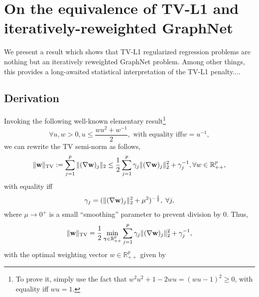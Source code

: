 
\section{On the equivalence of TV-L1 and iteratively-reweighted
  GraphNet}
We present a result which shows that TV-L1 regularized regression problems are nothing but an iteratively reweighted GraphNet problem. Among other things, this provides a long-awaited statistical interpretation of the TV-L1 penalty....

\subsection{Derivation}
Invoking the following
well-known elementary result\footnote{To prove it, simply use the fact
  that $w^2u^2 + 1 - 2wu = (wu - 1)^2 \ge 0$, with equality iff $wu =
  1$.}
\begin{equation}
\label{eq:rabbit}
\forall u,w > 0, u \le \frac{wu^2 + w^{-1}}{2},\text{ with equality iff
} w = u^{-1},
\end{equation}
we can rewrite the TV semi-norm as follows,
\begin{eqnarray}
\begin{split}
 \|\mathbf{w}\|_{\text{TV}} := \sum_{j=1}^p\|(\nabla
 \mathbf{w})_j\|_2  \le \frac{1}{2}
\sum_{j=1}^p \gamma_j\|(\nabla \mathbf{w})_j\|_2^2 + \gamma_j^{-1},
\forall w \in \mathbb R_{++}^p,
\end{split}
\end{eqnarray}
with equality  iff
\begin{eqnarray}
\gamma_j = (\|(\nabla \mathbf{w})_j\|_2^2 + \mu^2)^{-\frac{1}{2}},\;\forall j,
\label{eq:weights}
\end{eqnarray}
where $\mu \rightarrow 0^+$ is a small ``smoothing'' parameter to
prevent division by $0$. Thus,
\begin{eqnarray}
\|\mathbf{w}\|_{\text{TV}} = \frac{1}{2}\min_{\boldsymbol{\gamma} \in
  \mathbb R_{++}^p}
\sum_{j=1}^p \gamma_j\|(\nabla \mathbf{w})_j\|_2^2 + \gamma_j^{-1}
,
\end{eqnarray}
with the optimal weighting vector $w \in \mathbb R_{++}^p$ given by
